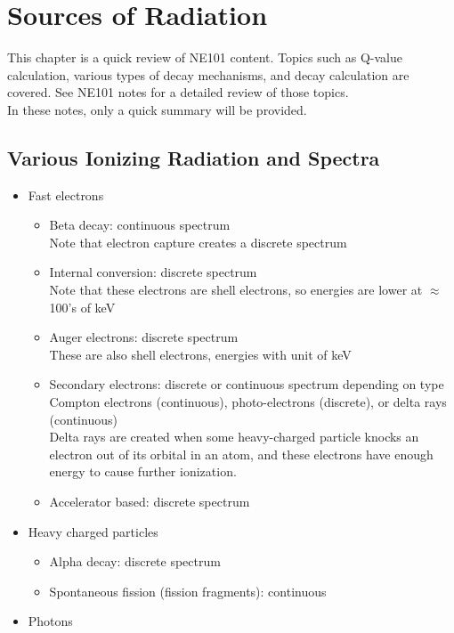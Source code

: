 \section{Sources of Radiation}
This chapter is a quick review of NE101 content. Topics such as Q-value calculation, various types of decay mechanisms, and decay calculation are covered. See NE101 notes for a detailed review of those topics.\\
In these notes, only a quick summary will be provided.
\subsection{Various Ionizing Radiation and Spectra}
\begin{itemize}
    \item Fast electrons
    \begin{itemize}
        \item Beta decay: continuous spectrum\\
        Note that electron capture creates a discrete spectrum
        \item Internal conversion: discrete spectrum\\
        Note that these electrons are shell electrons, so energies are lower at $\approx$100's of keV
        \item Auger electrons: discrete spectrum\\
        These are also shell electrons, energies with unit of keV
        \item Secondary electrons: discrete or continuous spectrum depending on type\\
        Compton electrons (continuous), photo-electrons (discrete), or delta rays (continuous)\\
        Delta rays are created when some heavy-charged particle knocks an electron out of its orbital in an atom, and these electrons have enough energy to cause further ionization. 
        \item Accelerator based: discrete spectrum
    \end{itemize}
    \item Heavy charged particles
    \begin{itemize}
        \item Alpha decay: discrete spectrum
        \item Spontaneous fission (fission fragments): continuous 
    \end{itemize}
    \item Photons
    \begin{itemize}

\end{itemize}
\end{itemize}
